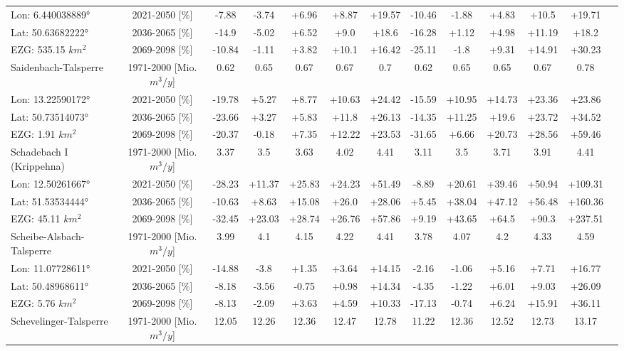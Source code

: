 \begin{longtable}{@{\extracolsep{\fill}}lc|ccccc||cccccc}
\cline{2-13} 
Lon: 6.440038889° & 2021-2050 [\%]  & -7.88 & -3.74 & +6.96 & +8.87 & +19.57 & -10.46 & -1.88 & +4.83 & +10.5 & +19.71 & \\ 
Lat: 50.63682222° & 2036-2065 [\%]  & -14.9 & -5.02 & +6.52 & +9.0 & +18.6 & -16.28 & +1.12 & +4.98 & +11.19 & +18.2 & \\ 
EZG: 535.15 $km^2$ & 2069-2098 [\%]  & -10.84 & -1.11 & +3.82 & +10.1 & +16.42 & -25.11 & -1.8 & +9.31 & +14.91 & +30.23 & \\ 
\hline 
Saidenbach-Talsperre & 1971-2000 [Mio. $m^3/y$]  & 0.62 & 0.65 & 0.67 & 0.67 & 0.7 & 0.62 & 0.65 & 0.65 & 0.67 & 0.78 & \\ 
\cline{2-13} 
Lon: 13.22590172° & 2021-2050 [\%]  & -19.78 & +5.27 & +8.77 & +10.63 & +24.42 & -15.59 & +10.95 & +14.73 & +23.36 & +23.86 & \\ 
Lat: 50.73514073° & 2036-2065 [\%]  & -23.66 & +3.27 & +5.83 & +11.8 & +26.13 & -14.35 & +11.25 & +19.6 & +23.72 & +34.52 & \\ 
EZG: 1.91 $km^2$ & 2069-2098 [\%]  & -20.37 & -0.18 & +7.35 & +12.22 & +23.53 & -31.65 & +6.66 & +20.73 & +28.56 & +59.46 & \\ 
\hline 
Schadebach I (Krippehna) & 1971-2000 [Mio. $m^3/y$]  & 3.37 & 3.5 & 3.63 & 4.02 & 4.41 & 3.11 & 3.5 & 3.71 & 3.91 & 4.41 & \\ 
\cline{2-13} 
Lon: 12.50261667° & 2021-2050 [\%]  & -28.23 & +11.37 & +25.83 & +24.23 & +51.49 & -8.89 & +20.61 & +39.46 & +50.94 & +109.31 & \\ 
Lat: 51.53534444° & 2036-2065 [\%]  & -10.63 & +8.63 & +15.08 & +26.0 & +28.06 & +5.45 & +38.04 & +47.12 & +56.48 & +160.36 & \\ 
EZG: 45.11 $km^2$ & 2069-2098 [\%]  & -32.45 & +23.03 & +28.74 & +26.76 & +57.86 & +9.19 & +43.65 & +64.5 & +90.3 & +237.51 & \\ 
\hline 
Scheibe-Alsbach-Talsperre & 1971-2000 [Mio. $m^3/y$]  & 3.99 & 4.1 & 4.15 & 4.22 & 4.41 & 3.78 & 4.07 & 4.2 & 4.33 & 4.59 & \\ 
\cline{2-13} 
Lon: 11.07728611° & 2021-2050 [\%]  & -14.88 & -3.8 & +1.35 & +3.64 & +14.15 & -2.16 & -1.06 & +5.16 & +7.71 & +16.77 & \\ 
Lat: 50.48968611° & 2036-2065 [\%]  & -8.18 & -3.56 & -0.75 & +0.98 & +14.34 & -4.35 & -1.22 & +6.01 & +9.03 & +26.09 & \\ 
EZG: 5.76 $km^2$ & 2069-2098 [\%]  & -8.13 & -2.09 & +3.63 & +4.59 & +10.33 & -17.13 & -0.74 & +6.24 & +15.91 & +36.11 & \\ 
\hline 
Schevelinger-Talsperre & 1971-2000 [Mio. $m^3/y$]  & 12.05 & 12.26 & 12.36 & 12.47 & 12.78 & 11.22 & 12.36 & 12.52 & 12.73 & 13.17 & \\ 

\end{longtable}
